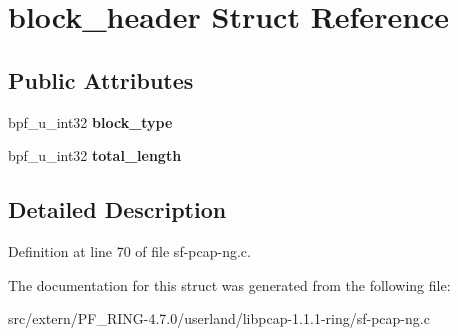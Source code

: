\hypertarget{structblock__header}{
\section{block\_\-header Struct Reference}
\label{structblock__header}
}
\subsection*{Public Attributes}
\begin{DoxyCompactItemize}
\item 
\hypertarget{structblock__header_a72486afe015cf37f0b277cdbf9ab7149}{
bpf\_\-u\_\-int32 {\bfseries block\_\-type}}
\label{structblock__header_a72486afe015cf37f0b277cdbf9ab7149}

\item 
\hypertarget{structblock__header_a932ecde2dc7cf7974860818cc6aa63fc}{
bpf\_\-u\_\-int32 {\bfseries total\_\-length}}
\label{structblock__header_a932ecde2dc7cf7974860818cc6aa63fc}

\end{DoxyCompactItemize}


\subsection{Detailed Description}


Definition at line 70 of file sf-\/pcap-\/ng.c.



The documentation for this struct was generated from the following file:\begin{DoxyCompactItemize}
\item 
src/extern/PF\_\-RING-\/4.7.0/userland/libpcap-\/1.1.1-\/ring/sf-\/pcap-\/ng.c\end{DoxyCompactItemize}
